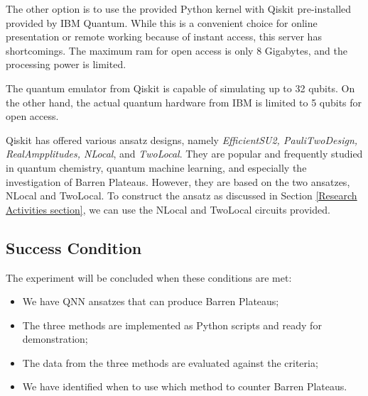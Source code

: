 The other option is to use the provided Python kernel with Qiskit pre-installed provided by IBM Quantum. 
While this is a convenient choice for online presentation or remote working because of instant access, this server has shortcomings. The maximum ram for open access is only 8 Gigabytes, and the processing power is limited.

The quantum emulator from Qiskit is capable of simulating up to 32 qubits. On the other hand, the actual quantum hardware from IBM is limited to 5 qubits for open access.

Qiskit has offered various ansatz designs, namely \textit{EfficientSU2, PauliTwoDesign, RealAmpplitudes, NLocal}, and \textit{TwoLocal}. They are popular and frequently studied in quantum chemistry, quantum machine learning, and especially the investigation of Barren Plateaus. 
However, they are based on the two ansatzes, NLocal and TwoLocal.
To construct the ansatz as discussed in Section \ref{Research Activities section}, we can use the NLocal and TwoLocal circuits provided.


\subsection{Success Condition}
The experiment will be concluded when these conditions are met:
\begin{itemize}
    \item We have QNN ansatzes that can produce Barren Plateaus;
    \item The three methods are implemented as Python scripts and ready for demonstration;
    \item The data from the three methods are evaluated against the criteria;
    \item We have identified when to use which method to counter Barren Plateaus.
\end{itemize}
